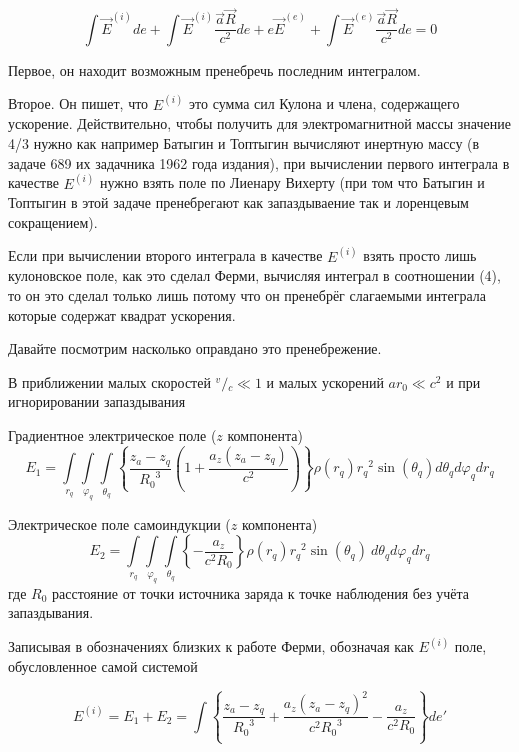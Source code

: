 \documentclass[11pt]{article}
\begin{document}
\[\int \vec E^{(i)} de + \int \vec E^{(i)}\frac{\vec a \vec R}{c^2} de + e \vec E^{(e)} + \int \vec E^{(e)}\frac{\vec a \vec R}{c^2} de = 0\]

    Первое, он находит возможным пренебречь последним интегралом.

Второе. Он пишет, что \(E^{(i)}\) это сумма сил Кулона и члена,
содержащего ускорение. Действительно, чтобы получить для
электромагнитной массы значение 4/3 нужно как например Батыгин и
Топтыгин вычисляют инертную массу (в задаче 689 их задачника 1962 года
издания), при вычислении первого интеграла в качестве \(E^{(i)}\) нужно
взять поле по Лиенару Вихерту (при том что Батыгин и Топтыгин в этой
задаче пренебрегают как запаздываение так и лоренцевым сокращением).

Если при вычислении второго интеграла в качестве \(E^{(i)}\) взять
просто лишь кулоновское поле, как это сделал Ферми, вычисляя интеграл в
соотношении (4), то он это сделал только лишь потому что он пренебрёг
слагаемыми интеграла которые содержат квадрат ускорения.

Давайте посмотрим насколько оправдано это пренебрежение.

В приближении малых скоростей \({}^{v} \big / {}_{c}\ll 1\) и малых
ускорений \(a{{r}_{0}}\ll {{c}^{2}}\) и при игнорировании запаздывания

Градиентное электрическое поле (\(z\) компонента) \[{E}_{1}=
\int\limits_{{{r}_{q}}}\int\limits_{{{\varphi}_{q}}}\int\limits_{{{\theta}_{q}}}
\left\{ \frac{z_a-z_q}{{{R}_{0}}^3}\left( 1+\frac{a_z\left( {{z}_{a}}-{{z}_{q}} \right)}{c^2} \right)
 \right\}
{\rho \left( {{r}_{q}} \right){{r}_{q}}^{2}\sin \left( {{\theta }_{q}} \right)}
d{{\theta }_{q}}d{{\varphi }_{q}}d{{r}_{q}}\]

Электрическое поле самоиндукции (\(z\) компонента) \[{E}_{2}=
\int\limits_{{{r}_{q}}}\int\limits_{{{\varphi}_{q}}}\int\limits_{{{\theta}_{q}}}
{\left\{ -\frac{{a_z}}{{{c}^{2}}{{{R}_{0}}}} \right\}
{\rho \left( {{r}_{q}} \right){{r}_{q}}^{2}\sin \left( {{\theta }_{q}} \right)}\ }d{{\theta }_{q}}d{{\varphi }_{q}}d{{r}_{q}}\]
где \({R}_{0}\) расстояние от точки источника заряда к точке наблюдения
без учёта запаздывания.

Записывая в обозначениях близких к работе Ферми, обозначая как
\({E}^{(i)}\) поле, обусловленное самой системой

\[{E}^{(i)}={E}_{1}+{E}_{2}=
\int\left\{ \frac{z_a-z_q}{{{R}_{0}}^3}+\frac{a_z\left( {{z}_{a}}-{{z}_{q}} \right)^2}{c^2{{{R}_{0}}^3}} - \frac{{a_z}}{{{c}^{2}}{{{R}_{0}}}}
\right\} de'\]
\end{document}
